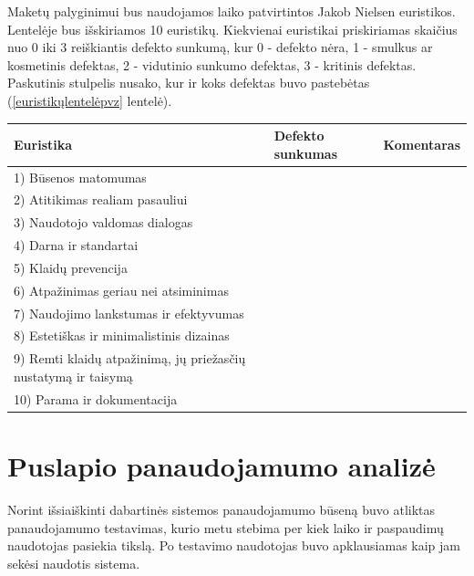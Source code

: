 \documentclass{VUMIFPSkursinis}
\begin{document}
Maketų palyginimui bus naudojamos laiko patvirtintos Jakob Nielsen euristikos\cite{NielsenHeuristicsEn}. Lentelėje bus išskiriamos 10 euristikų. Kiekvienai euristikai priskiriamas skaičius nuo 0 iki 3 reiškiantis defekto sunkumą, kur 0 - defekto nėra, 1 - smulkus ar kosmetinis defektas, 2 - vidutinio sunkumo defektas, 3 - kritinis defektas. Paskutinis stulpelis nusako, kur ir koks defektas buvo pastebėtas (\ref{euristikųlentelėpvz} lentelė).
\begin{center}
\begin{tabular}{ | p{7cm} | p{2cm} | p{} | } 
 \hline
	Euristika & Defekto sunkumas & Komentaras \\ \hline
	1) Būsenos matomumas &  &  \\ \hline
	2) Atitikimas realiam pasauliui  &  &  \\ \hline
	3) Naudotojo valdomas dialogas &  &  \\ \hline
	4) Darna ir standartai &  &  \\ \hline
	5) Klaidų prevencija &  &  \\ \hline
	6) Atpažinimas geriau nei atsiminimas &  &  \\ \hline
	7) Naudojimo lankstumas ir efektyvumas &  &  \\ \hline
	8) Estetiškas ir minimalistinis dizainas &  &  \\ \hline
	9) Remti klaidų atpažinimą, jų priežasčių nustatymą ir taisymą &  &  \\ \hline
	10) Parama ir dokumentacija &  &  \\ \hline
\end{tabular}
\label{euristikųlentelėpvz}
\end{center}

\section{Puslapio panaudojamumo analizė}
Norint išsiaiškinti dabartinės sistemos panaudojamumo būseną buvo atliktas panaudojamumo testavimas, kurio metu stebima per kiek laiko ir paspaudimų naudotojas pasiekia tikslą. Po testavimo naudotojas buvo apklausiamas kaip jam sekėsi naudotis sistema.
\end{document}
